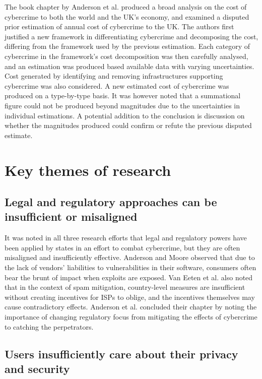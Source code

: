\documentclass[11pt]{article}
\begin{document}
The book chapter by Anderson et al. \cite{anderson2013measuring} produced a broad analysis on the cost of cybercrime to both the world and the UK's economy, and examined a disputed prior estimation of annual cost of cybercrime to the UK. The authors first justified a new framework in differentiating cybercrime and decomposing the cost, differing from the framework used by the previous estimation. Each category of cybercrime in the framework's cost decomposition was then carefully analysed, and an estimation was produced based available data with varying uncertainties. Cost generated by identifying and removing infrastructures supporting cybercrime was also considered. A new estimated cost of cybercrime was produced on a type-by-type basis. It was however noted that a summational figure could not be produced beyond magnitudes due to the uncertainties in individual estimations. A potential addition to the conclusion is discussion on whether the magnitudes produced could confirm or refute the previous disputed estimate.

\section{Key themes of research}

\subsection{Legal and regulatory approaches can be insufficient or misaligned}

It was noted in all three research efforts that legal and regulatory powers have been applied by states in an effort to combat cybercrime, but they are often misaligned and insufficiently effective. Anderson and Moore \cite[Sec. 4]{anderson2009information} observed that due to the lack of vendors' liabilities to vulnerabilities in their software, consumers often bear the brunt of impact when exploits are exposed. Van Eeten et al. \cite[p. 13]{van2010role} also noted that in the context of spam mitigation, country-level measures are insufficient without creating incentives for ISPs to oblige, and the incentives themselves may cause contradictory effects. Anderson et al. \cite[12.6]{anderson2013measuring} concluded their chapter by noting the importance of changing regulatory focus from mitigating the effects of cybercrime to catching the perpetrators.

\subsection{Users insufficiently care about their privacy and security}
\end{document}

